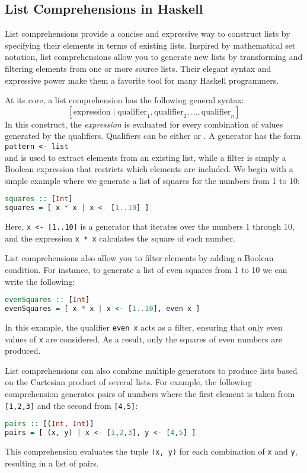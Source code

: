 \subsection{List Comprehensions in Haskell}
List comprehensions provide a concise and expressive way to construct lists by specifying their elements in
terms of existing lists. Inspired by mathematical set notation, list comprehensions allow you to generate new
lists by transforming and filtering elements from one or more source lists. Their elegant syntax and expressive
power make them a favorite tool for many Haskell programmers. 

At its core, a list comprehension has the following general syntax:
\[
[ \text{expression} \; | \; \text{qualifier}_1, \text{qualifier}_2, \dots, \text{qualifier}_n ]
\]
In this construct, the \emph{expression} is evaluated for every combination of values generated by the
qualifiers. Qualifiers can be either   or .  A generator has the form
\\[0.2cm]
\hspace*{1.3cm}
\texttt{pattern <- list}
\\[0.2cm]
 and is used to extract elements from an existing list, while a filter is simply a
Boolean expression that restricts which elements are included. 
We begin with  a simple example where we generate a list of squares for the numbers from 1 to 10:
\begin{lstlisting}[style=haskellstyle, language=Haskell]
squares :: [Int]
squares = [ x * x | x <- [1..10] ]
\end{lstlisting}
Here, \texttt{x <- [1..10]} is a generator that iterates over the numbers 1 through 10, and the expression
\texttt{x * x} calculates the square of each number. 

List comprehensions also allow you to filter elements by adding a Boolean condition. For instance, to generate
a list of even squares from 1 to 10 we can write the following:
\begin{lstlisting}[style=haskellstyle, language=Haskell]
evenSquares :: [Int]
evenSquares = [ x * x | x <- [1..10], even x ]
\end{lstlisting}
In this example, the qualifier \texttt{even x} acts as a filter, ensuring that only even values of \texttt{x}
are considered. As a result, only the squares of even numbers are produced. 

List comprehensions can also combine multiple generators to produce lists based on the Cartesian product of
several lists. For example, the following comprehension generates pairs of numbers where the first element is
taken from \texttt{[1,2,3]} and the second from \texttt{[4,5]}: 
\begin{lstlisting}[style=haskellstyle, language=Haskell]
pairs :: [(Int, Int)]
pairs = [ (x, y) | x <- [1,2,3], y <- [4,5] ]
\end{lstlisting}
This comprehension evaluates the tuple \texttt{(x, y)} for each combination of \texttt{x} and \texttt{y}, resulting in a list of pairs.




